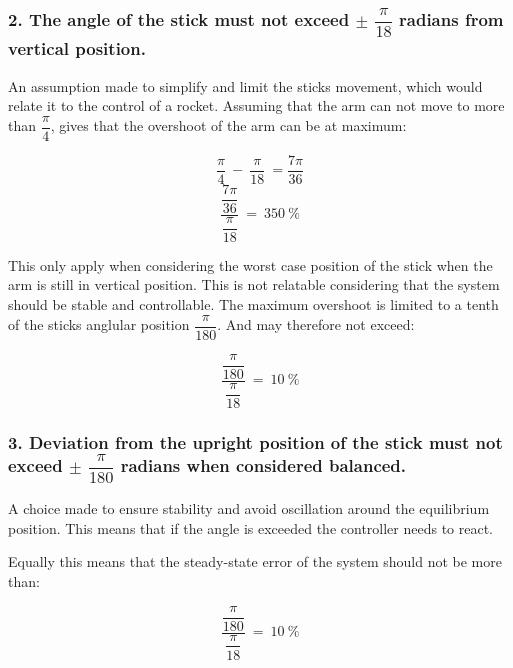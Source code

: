 \subsubsection*{2. The angle of the stick must not exceed $\pm$ $\dfrac{\pi}{18}$ radians from vertical position.}
\forceindent An assumption made to simplify and limit the sticks movement, which would relate it to the control of a rocket. Assuming that the arm can not move to more than $\dfrac{\pi}{4}$, gives that the overshoot of the arm can be at maximum:


\begin{equation}
\dfrac{\pi}{4}\ -\ \dfrac{\pi}{18}\ = \dfrac{7\pi}{36}
\end{equation}
\begin{equation}
\frac{\dfrac{7\pi}{36}}{\dfrac{\pi}{18}}\ =\ 350\ \% 
\end{equation}

This only apply when considering the worst case position of the stick when the arm is still in vertical position. This is not relatable considering that the system should be stable and controllable.  The maximum overshoot is limited to a tenth of the sticks anglular position $\dfrac{\pi}{180}$. And may therefore not exceed:

\begin{equation}
\frac{\dfrac{\pi}{180}}{\dfrac{\pi}{18}}\ =\ 10\ \% 
\end{equation}



\subsubsection*{3. Deviation from the upright position of the stick must not exceed $\pm$ $\dfrac{\pi}{180}$ radians when considered balanced.}
\forceindent A choice made to ensure stability and avoid oscillation around the equilibrium position.
This means that if the angle is exceeded the controller needs to react.

Equally this means that the steady-state error of the system should not be more than:  

\begin{equation}
\frac{\dfrac{\pi}{180}}{\dfrac{\pi}{18}}\ =\ 10\ \% 
\end{equation}


